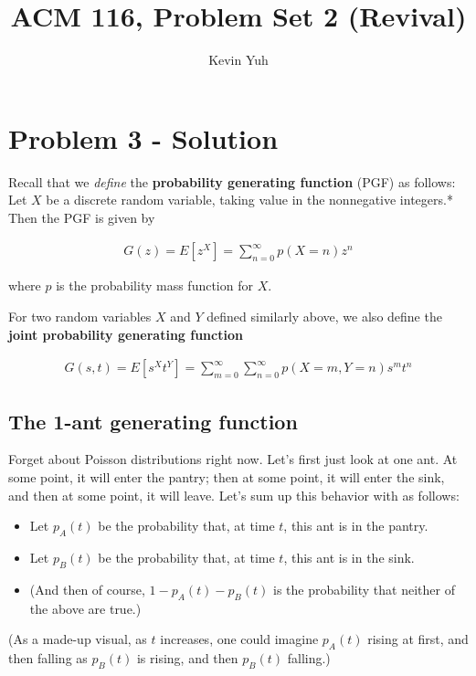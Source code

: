 \documentclass{article}
\title{ACM 116, Problem Set 2 (Revival)}
\author{Kevin Yuh}
\begin{document}
\maketitle

\section{Problem 3 - Solution}



Recall that we \emph{define} the \textbf{probability generating function} (PGF) as follows: Let $X$ be a discrete random variable, taking value in the nonnegative integers.* Then the PGF is given by 

\begin{align*}
G(z) = E[z^X] = \sum_{n=0}^{\infty} p(X = n)z^n
\end{align*}

where $p$ is the probability mass function for $X$. 

For two random variables $X$ and $Y$ defined similarly above, we also define the \textbf{joint probability generating function}

\begin{align*}
G(s,t) = E[s^X t^Y] = \sum_{m=0}^{\infty} \sum_{n=0}^{\infty} p(X = m, Y = n)s^m t^n
\end{align*}


\subsection{The 1-ant generating function}

Forget about Poisson distributions right now. Let's first just look at one ant. At some point, it will enter the pantry; then at some point, it will enter the sink, and then at some point, it will leave. Let's sum up this behavior with as follows:

\begin{itemize}
\item Let $p_A(t)$ be the probability that, at time $t$, this ant is in the pantry.
\item Let $p_B(t)$ be the probability that, at time $t$, this ant is in the sink.
\item (And then of course, $1 - p_A(t) - p_B(t)$ is the probability that neither of the above are true.)
\end{itemize}


\vspace{10mm}

(As a made-up visual, as $t$ increases, one could imagine $p_A(t)$ rising at first, and then falling as $p_B(t)$ is rising, and then $p_B(t)$ falling.)
\end{document}

